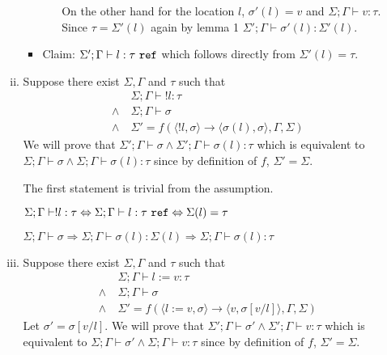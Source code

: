 \begin{enumerate}[(a)]
\begin{enumerate}[i.]
\begin{itemize}
\begin{itemize}
    On the other hand for the location $l$, $\sigma'(l) = v$ and $\Sigma;\Gamma \vdash v : \tau$. Since $\tau = \Sigma'(l)$ again by lemma 1 $\Sigma';\Gamma \vdash \sigma'(l) : \Sigma'(l)$.
    \end{itemize}
    \item Claim: $\Sigma';\Gamma \vdash l : \tau ~\texttt{ref}$ which follows directly from $\Sigma'(l) = \tau$.
  \end{itemize}
\item {}

  Suppose there exist $\Sigma, \Gamma$ and $\tau$ such that 
  \begin{align*}
  &\Sigma;\Gamma \vdash !l : \tau \\
  \wedge~&\Sigma;\Gamma \vdash \sigma\\
  \wedge~&\Sigma' = f(\langle !l, \sigma \rangle \rightarrow \langle \sigma(l), \sigma \rangle, \Gamma, \Sigma)
  \end{align*}
  We will prove that $\Sigma';\Gamma \vdash \sigma \wedge \Sigma';\Gamma \vdash \sigma(l) : \tau$ which is equivalent to $\Sigma;\Gamma \vdash \sigma \wedge \Sigma;\Gamma \vdash \sigma(l) : \tau$ since by definition of $f$, $\Sigma' = \Sigma$.

  The first statement is trivial from the assumption.

  $\Sigma;\Gamma \vdash !l : \tau \Leftrightarrow \Sigma;\Gamma \vdash l : \tau ~ \texttt{ref} \Leftrightarrow \Sigma(l) = \tau$

  $\Sigma; \Gamma \vdash \sigma \Rightarrow \Sigma;\Gamma \vdash \sigma(l) : \Sigma(l) \Rightarrow \Sigma;\Gamma \vdash \sigma(l) : \tau$

\item {}

  Suppose there exist $\Sigma, \Gamma$ and $\tau$ such that 
  \begin{align*}
  &\Sigma;\Gamma \vdash l := v : \tau \\
  \wedge~&\Sigma;\Gamma \vdash \sigma\\
  \wedge~&\Sigma' = f(\langle l := v, \sigma \rangle \rightarrow \langle v, \sigma[v/l] \rangle, \Gamma, \Sigma)
  \end{align*}
  Let $\sigma' = \sigma[v/l]$. We will prove that $\Sigma';\Gamma \vdash \sigma' \wedge \Sigma';\Gamma \vdash v : \tau$ which is equivalent to $\Sigma;\Gamma \vdash \sigma' \wedge \Sigma;\Gamma \vdash v : \tau$ since by definition of $f$, $\Sigma' = \Sigma$.


\end{enumerate}
\end{enumerate}
